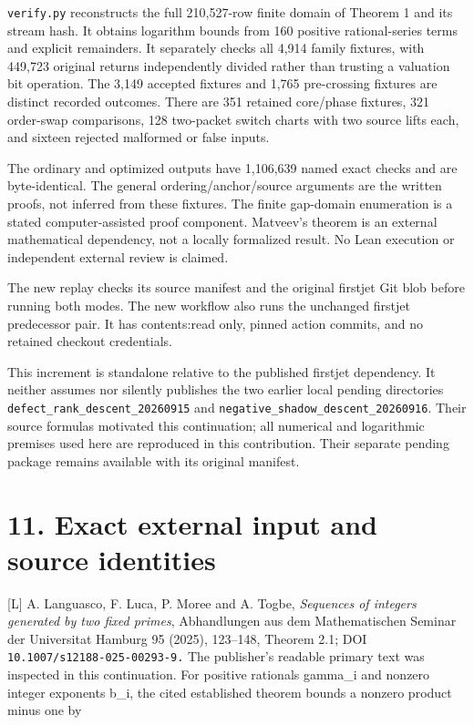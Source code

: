 \nolinkurl{verify.py} reconstructs the full 210,527-row finite domain of
Theorem 1 and its stream hash. It obtains logarithm bounds from 160
positive rational-series terms and explicit remainders. It separately
checks all 4,914 family fixtures, with 449,723 original returns
independently divided rather than trusting a valuation bit operation.
The 3,149 accepted fixtures and 1,765 pre-crossing fixtures are distinct
recorded outcomes. There are 351 retained core/phase fixtures, 321
order-swap comparisons, 128 two-packet switch charts with two source
lifts each, and sixteen rejected malformed or false inputs.

The ordinary and optimized outputs have 1,106,639 named exact checks and
are byte-identical. The general ordering/anchor/source arguments are the
written proofs, not inferred from these fixtures. The finite gap-domain
enumeration is a stated computer-assisted proof component. Matveev's
theorem is an external mathematical dependency, not a locally formalized
result. No Lean execution or independent external review is claimed.

The new replay checks its source manifest and the original firstjet Git
blob before running both modes. The new workflow also runs the unchanged
firstjet predecessor pair. It has contents:read only, pinned action
commits, and no retained checkout credentials.

This increment is standalone relative to the published firstjet
dependency. It neither assumes nor silently publishes the two earlier
local pending directories \nolinkurl{defect_rank_descent_20260915} and
\nolinkurl{negative_shadow_descent_20260916}. Their source formulas
motivated this continuation; all numerical and logarithmic premises used
here are reproduced in this contribution. Their separate pending package
remains available with its original manifest.

\section{11. Exact external input and source identities}

{[}L{]} A. Languasco, F. Luca, P. Moree and A. Togbe, \emph{Sequences of
integers generated by two fixed primes}, Abhandlungen aus dem
Mathematischen Seminar der Universitat Hamburg 95 (2025), 123--148,
Theorem 2.1; DOI \nolinkurl{10.1007/s12188-025-00293-9.} The publisher's
readable primary text was inspected in this continuation. For positive
rationals gamma\_i and nonzero integer exponents b\_i, the cited
established theorem bounds a nonzero product minus one by

